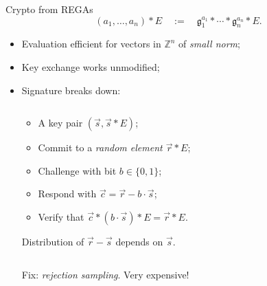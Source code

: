 \documentclass[aspectratio=169]{beamer}
\newcommand{\Z}{ℤ}
\newcommand{\g}{\mathfrak{g}}
\begin{document}
\begin{frame}{Crypto from REGAs}
  \[(a_1, \ldots, a_n) * E \quad:=\quad \g_1^{a_1} * \cdots * \g_n^{a_n} * E.\]

  \begin{itemize}
  \item Evaluation efficient for vectors in $\Z^n$ of \emph{small norm};
  \item Key exchange works unmodified;
  \item<2-> Signature breaks down:
    \begin{columns}
      \begin{column}{0.40\textwidth}
        \begin{itemize}
        \item A key pair \emph{$(\vec{s}, \vec{s}*E)$};
        \item Commit to a \emph{random element $\vec{r}*E$};
        \item Challenge with bit \emph{$b\in\{0,1\}$};
        \item \alert{Respond with $\vec{c} = \vec{r} - b\cdot\vec{s}$};
        \item Verify that \emph{$\vec{c}*(b\cdot\vec{s})*E = \vec{r}*E$}.
        \end{itemize}
        Distribution of \alert{$\vec{r}-\vec{s}$} depends on \alert{$\vec{s}$}.
      \end{column}
      \begin{column}{0.40\textwidth}
        \centering
      \end{column}
    \end{columns}

    \medskip
    Fix: \emph{rejection sampling}. Very expensive!
  \end{itemize}
\end{frame}

\end{document}
